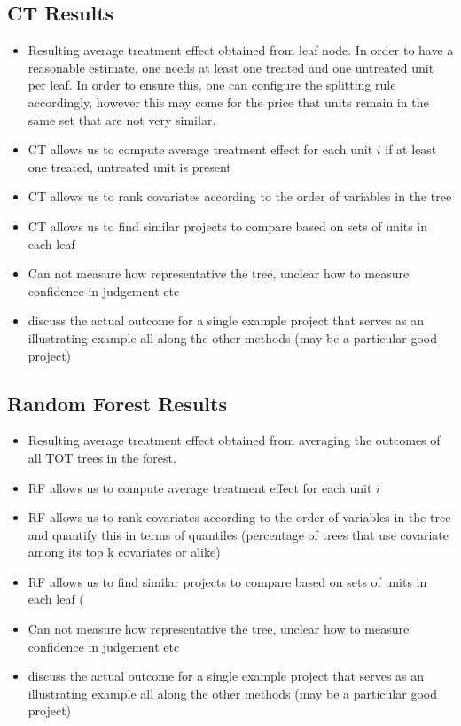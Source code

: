 \subsection{CT Results}
\begin{itemize}
\item Resulting average treatment effect obtained from leaf node. In order to have a reasonable estimate, one needs at least one treated and one untreated unit per leaf. In order to ensure this, one can configure the splitting rule accordingly, however this may come for the price that units remain in the same set that are not very similar.
\item CT allows us to compute average treatment effect for each unit $i$ if at least one treated, untreated unit is present
\item CT allows us to rank covariates according to the order of variables in the tree
\item CT allows us to find similar projects to compare based on sets of units in each leaf
\item Can not measure how representative the tree, unclear how to measure confidence in judgement etc
\item discuss the actual outcome for a single example project that serves as an illustrating example all along the other methods (may be a particular good project)
\end{itemize}

\subsection{Random Forest Results}
\begin{itemize}
\item Resulting average treatment effect obtained from averaging the outcomes of all TOT trees in the forest. 
\item RF allows us to compute average treatment effect for each unit $i$
\item RF allows us to rank covariates according to the order of variables in the tree and quantify this in terms of quantiles (percentage of trees that use covariate among its top k covariates or alike)
\item RF allows us to find similar projects to compare based on sets of units in each leaf (
\item Can not measure how representative the tree, unclear how to measure confidence in judgement etc
\item discuss the actual outcome for a single example project that serves as an illustrating example all along the other methods (may be a particular good project)
\end{itemize}

